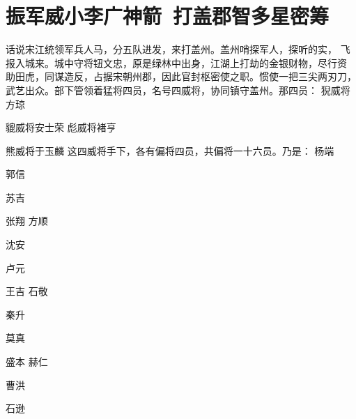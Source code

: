 \chapter{振军威小李广神箭~打盖郡智多星密筹}

话说宋江统领军兵人马，分五队进发，来打盖州。盖州哨探军人，探听的实，
飞报入城来。城中守将钮文忠，原是绿林中出身，江湖上打劫的金银财物，尽行资
助田虎，同谋造反，占据宋朝州郡，因此官封枢密使之职。惯使一把三尖两刃刀，
武艺出众。部下管领着猛将四员，名号四威将，协同镇守盖州。那四员：
猊威将方琼

貔威将安士荣
彪威将褚亨

熊威将于玉麟
这四威将手下，各有偏将四员，共偏将一十六员。乃是：
杨端

郭信

苏吉

张翔
方顺

沈安

卢元

王吉
石敬

秦升

莫真

盛本
赫仁

曹洪

石逊

